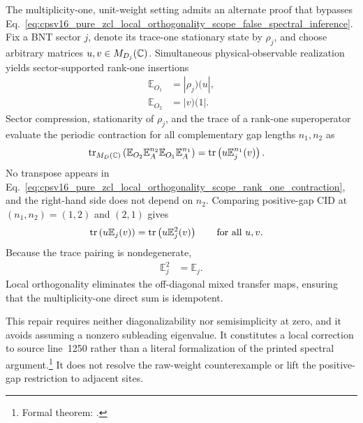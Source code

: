 \documentclass{article}
\begin{document}
The multiplicity-one, unit-weight setting admits an alternate proof that
bypasses
Eq.~\ref{eq:cpsv16_pure_zcl_local_orthogonality_scope_false_spectral_inference}.
Fix a BNT sector $j$, denote its trace-one stationary state by $\rho_j$, and
choose arbitrary matrices $u,v\in M_{D_j}(\mathbb{C})$. Simultaneous physical-observable
realization yields sector-supported rank-one insertions
\begin{align}
    \mathbb E_{O_1}
        &= |\rho_j)(u|,
    \label{eq:cpsv16_pure_zcl_local_orthogonality_scope_first_rank_one_insertion}\\
    \mathbb E_{O_2}
        &= |v)(1|.
    \label{eq:cpsv16_pure_zcl_local_orthogonality_scope_second_rank_one_insertion}
\end{align}
Sector compression, stationarity of $\rho_j$, and the trace of a rank-one
superoperator evaluate the periodic contraction for all complementary gap
lengths $n_1,n_2$ as
\begin{align}
    \operatorname{tr}_{M_D(\mathbb{C})}
    \left(\mathbb E_{O_2}\mathbb E_A^{n_2}
        \mathbb E_{O_1}\mathbb E_A^{n_1}\right)
        &= \operatorname{tr}\left(u\mathbb E_j^{n_1}(v)\right).
    \label{eq:cpsv16_pure_zcl_local_orthogonality_scope_rank_one_contraction}
\end{align}
No transpose appears in
Eq.~\ref{eq:cpsv16_pure_zcl_local_orthogonality_scope_rank_one_contraction}, and
the right-hand side does not depend on $n_2$. Comparing positive-gap CID at
$(n_1,n_2)=(1,2)$ and $(2,1)$ gives
\begin{align}
    \operatorname{tr}\left(u\mathbb E_j(v)\right)
        &= \operatorname{tr}\left(u\mathbb E_j^2(v)\right)
        \qquad\text{for all }u,v.
    \label{eq:cpsv16_pure_zcl_local_orthogonality_scope_trace_pairing_identity}
\end{align}
Because the trace pairing is nondegenerate,
\begin{align}
    \mathbb E_j^2 &= \mathbb E_j.
    \label{eq:cpsv16_pure_zcl_local_orthogonality_scope_sector_idempotence}
\end{align}
Local orthogonality eliminates the off-diagonal mixed transfer maps, ensuring
that the multiplicity-one direct sum is idempotent.

This repair requires neither diagonalizability nor semisimplicity at zero, and
it avoids assuming a nonzero subleading eigenvalue. It constitutes a local
correction to source line~1250 rather than a literal formalization of the
printed spectral argument.\footnote{Formal theorem:
.}
It does not resolve the raw-weight counterexample or lift the positive-gap
restriction to adjacent sites.
\end{document}
